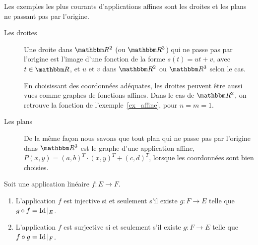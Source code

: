 \begin{example}
	Les exemples les plus courants d'applications affines sont les droites et les plans ne passant pas par l'origine.
	\begin{description}
		\item[Les droites] Une droite dans $\eR^2$ (ou $\eR^3$) qui ne passe pas par l'origine est l'image d'une fonction de la forme $s(t) =u t +v$, avec $t \in \eR$, et $u$ et $v$ dans $\eR^2$ ou $\eR^3$ selon le cas. 

		En choisissant des coordonnées adéquates, les droites peuvent être aussi vues comme graphes de fonctions affines. Dans le cas de $\eR^2$, on retrouve la fonction de l'exemple~\ref{ex_affine}, pour \( n = m = 1 \).

		\item[Les plans]
			De la même façon nous savons que tout plan qui ne passe pas par l'origine dans $\eR^3$ est le graphe d'une application affine, $P(x,y)= (a,b)^T\cdot(x,y)^T+(c,d)^T$, lorsque les coordonnées sont bien choisies.
	\end{description}
\end{example}

\begin{lemma}        \label{LEMooDAACooElDsYb}
    Soit une application linéaire \( f\colon E\to F\).
    \begin{enumerate}
        \item       \label{ITEMooEZEWooZGoqsZ}
            L'application \( f\) est injective si et seulement s'il existe \( g\colon F\to E\) telle que \( g\circ f=\operatorname{Id}|_E\).
        \item
            L'application \( f\) est surjective si et seulement s'il existe \( g\colon F\to E\) telle que \( f\circ g=\operatorname{Id}|_F\).
    \end{enumerate}
\end{lemma}

